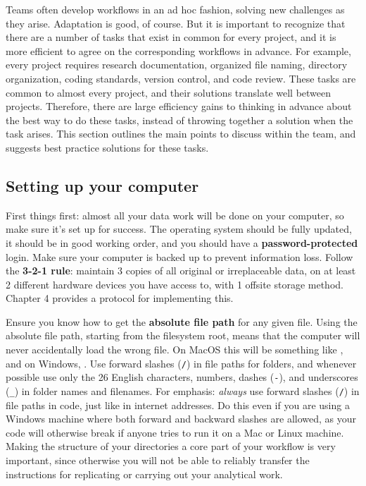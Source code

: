 Teams often develop workflows in an ad hoc fashion,
solving new challenges as they arise.
Adaptation is good, of course.
But it is important to recognize
that there are a number of tasks that exist in common for every project,
and it is more efficient to agree on the corresponding workflows in advance.
For example, every project requires
research documentation, organized file naming, directory organization,
coding standards, version control, and code review.
These tasks are common to almost every project,
and their solutions translate well between projects.
Therefore, there are large efficiency gains to
thinking in advance about the best way to do these tasks,
instead of throwing together a solution when the task arises.
This section outlines the main points to discuss within the team,
and suggests best practice solutions for these tasks.

\subsection{Setting up your computer}

First things first:
almost all your data work will be done on your computer,
so make sure it's set up for success.
The operating system should be fully updated,
it should be in good working order,
and you should have a \textbf{password-protected} login.
Make sure your computer is backed up to prevent information loss.
Follow the \textbf{3-2-1 rule}: maintain 3 copies of all original or irreplaceable data,
on at least 2 different hardware devices you have access to,
with 1 offsite storage method.
Chapter 4 provides a protocol for implementing this.

Ensure you know how to get the \textbf{absolute file path} for any given file.
Using the absolute file path, starting from the filesystem root,
means that the computer will never accidentally load the wrong file.
On MacOS this will be something like ,
and on Windows, .
Use forward slashes (\texttt{/}) in file paths for folders,
and whenever possible use only the 26 English characters, numbers,
dashes (\texttt{-}), and underscores (\texttt{\_}) in folder names and filenames.
For emphasis: \textit{always} use forward slashes (\texttt{/}) 
in file paths in code, just like in internet addresses. 
Do this even if you are using a Windows machine where
both forward and backward slashes are allowed, 
as your code will otherwise break
if anyone tries to run it on a Mac or Linux machine.
Making the structure of your directories a core part of your workflow is very important,
since otherwise you will not be able to reliably transfer the instructions
for replicating or carrying out your analytical work.


